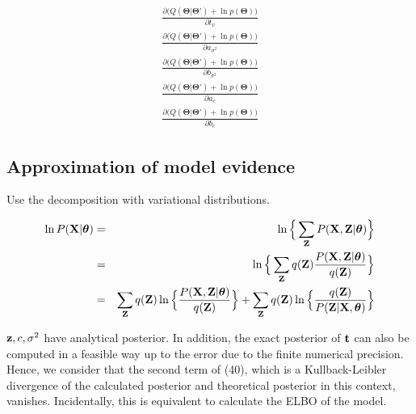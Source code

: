 \documentclass{article}
\begin{document}
	\begin{eqnarray}
	\frac{\partial \big( Q(\boldsymbol{\Theta}|\boldsymbol{\Theta}') + \ln{p(\boldsymbol{\Theta})} \big)}{\partial t_v} \\
	\frac{\partial \big( Q(\boldsymbol{\Theta}|\boldsymbol{\Theta}') + \ln{p(\boldsymbol{\Theta})} \big)}{\partial a_{\sigma^2}} \\
	\frac{\partial \big( Q(\boldsymbol{\Theta}|\boldsymbol{\Theta}') + \ln{p(\boldsymbol{\Theta})} \big)}{\partial b_{\sigma^2}} \\
	\frac{\partial \big( Q(\boldsymbol{\Theta}|\boldsymbol{\Theta}') + \ln{p(\boldsymbol{\Theta})} \big)}{\partial a_c} \\
	\frac{\partial \big( Q(\boldsymbol{\Theta}|\boldsymbol{\Theta}') + \ln{p(\boldsymbol{\Theta})} \big)}{\partial b_c}
	\end{eqnarray}
	
	\subsection{Approximation of model evidence}
	Use the decomposition with variational distributions.
	
	\begin{eqnarray}
		\ln P(\bold{X}|\boldsymbol{\theta}) &=& \ln \Big\{\sum_\bold{Z}P(\bold{X}, \bold{Z} | \boldsymbol{\theta}) \Big\} \nonumber \\
		&=& \ln \Big\{\sum_\bold{Z}q(\bold{Z})\frac{P(\bold{X}, \bold{Z}|\boldsymbol{\theta})}{q(\bold{Z})} \Big\} \nonumber \\
		&=& \sum_\bold{Z}q(\bold{Z})\ln \Big\{ \frac{P(\bold{X}, \bold{Z}| \boldsymbol{\theta})}{q(\bold{Z})} \Big\} + \sum_\bold{Z}q(\bold{Z})\ln \Big\{ \frac{q(\bold{Z})}{P(\bold{Z}|\bold{X}, \boldsymbol{\theta})} \Big\}
	\end{eqnarray}
	
	$\bold{z}, c, \sigma^2$ have analytical posterior. In addition, the exact posterior of $\bold{t}$ can also be computed in a feasible way up to the error due to the finite numerical precision. Hence, we consider that the second term of (40), which is a Kullback-Leibler divergence of the calculated posterior and theoretical posterior in this context, vanishes. Incidentally, this is equivalent to calculate the ELBO of the model.
	
\end{document}
